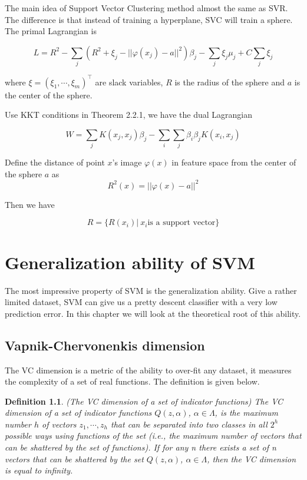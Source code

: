 \documentclass[a4paper]{report}
\newtheorem{definition}{Definition}[section]
\begin{document}
The main idea of Support Vector Clustering method\cite{ben2001support} almost the same as SVR. The difference is that instead of training a hyperplane, SVC will train a sphere. The primal Lagrangian is

\[
    L=R^2-\sum_j (R^2+\xi_j-||\varphi(x_j)-a||^2)\beta_j-\sum_j\xi_j\mu_j+C\sum_j\xi_j
\]

where $\xi=(\xi_1,\cdots,\xi_m)^\top$ are slack variables, $R$ is the radius of the sphere and $a$ is the center of the sphere.

Use KKT conditions in Theorem 2.2.1, we have the dual Lagrangian

\[
    W=\sum_jK(x_j,x_j)\beta_j-\sum_i\sum_j\beta_i\beta_jK(x_i,x_j)
\]

Define the distance of point $x$'s image $\varphi(x)$ in feature space from the center of the sphere $a$ as
\[
    R^2(x)=||\varphi(x)-a||^2
\]

Then we have

\[
    R=\{R(x_i)|\ x_i \text{is a support vector} \}
\]

\chapter{Generalization ability of SVM}

The most impressive property of SVM is the generalization ability. Give a rather limited dataset, SVM can give us a pretty descent classifier with a very low prediction error. In this chapter we will look at the theoretical root of this ability.

\section{Vapnik-Chervonenkis dimension}

The VC dimension is a metric of the ability to over-fit any dataset, it measures the complexity of a set of real functions. The definition is given below.

\begin{definition}
    (The VC dimension of a set of indicator functions\cite{vapnik2013nature}) The VC dimension of a set of indicator functions $Q(z,\alpha)$, $\alpha\in\Lambda$, is the maximum number $h$ of vectors $z_1,\cdots,z_h$ that can be separated into two classes in all $2^h$ possible ways using functions of the set (i.e., the maximum number of vectors that can be shattered by the set of functions). If for any n there exists a set of n vectors that can be shattered by the set
    $Q(z,\alpha)$, $\alpha\in\Lambda$, then the VC dimension is equal to infinity.
\end{definition}
\end{document}
